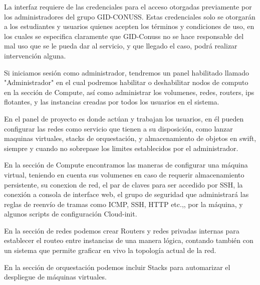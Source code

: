     La interfaz requiere de las credenciales para el acceso otorgadas previamente por los administradores del grupo GID-CONUSS. Estas credenciales solo se otorgarán a los estudiantes y usuarios quienes acepten los términos y condiciones de uso, en los cuales se especifica claramente que GID-Conuss no se hace responsable del mal uso que se le pueda dar al servicio, y que llegado el caso, podrá realizar intervención alguna.
    
    
    Si iniciamos sesión como administrador, tendremos un panel habilitado llamado "Administrador" en el cual podremos habilitar o deshabilitar nodos de computo en la sección de Compute, así como administrar los volumenes, redes, routers, ips flotantes, y las instancias creadas por todos los usuarios en el sistema.
    
    
    En el panel de proyecto es donde actúan y trabajan los usuarios, en él pueden configurar las redes como servicio que tienen a su disposición, como lanzar maquinas virtuales, stacks de orquestación, y almacenamiento de objetos en swift, siempre y cuando no sobrepase los limites establecidos por el administrador.
    
    
    En la sección de Compute encontramos las maneras de configurar una máquina virtual, teniendo en cuenta sus volumenes en caso de requerir almacenamiento persistente, su conexion de red, el par de claves para ser accedido por SSH, la conexión a consola de interface web, el grupo de seguridad que administrará las reglas de reenvío de tramas como ICMP, SSH, HTTP etc.,, por la máquina, y algunos scripts de configuración Cloud-init.
    
    En la sección de redes podemos crear Routers y redes privadas internas para establecer el routeo entre instancias de una manera lógica, contando también con un sistema que permite graficar en vivo la topología actual de la red.
    
    En la sección de orquestación podemos incluir Stacks para automarizar el despliegue de máquinas virtuales.
    
